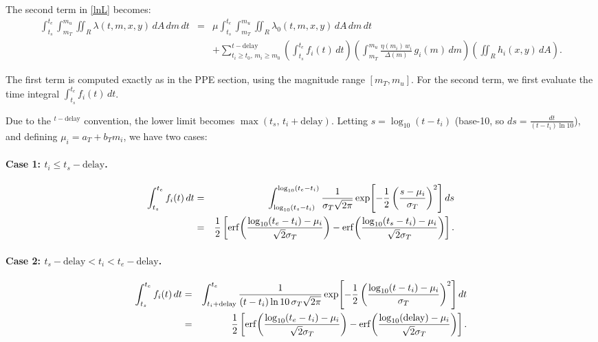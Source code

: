 \documentclass[linenum,doublespace,onecolumn]{SSA-SRL}
\theoremstyle{lemma}
\begin{document}
The second term in \eqref{lnL} becomes:
\begin{eqnarray*}
\int_{t_s}^{t_e} \int_{m_T}^{m_u} \iint_{R} \lambda(t, m, x, y)\, dA\, dm\, dt 
&=& \mu \int_{t_s}^{t_e} \int_{m_T}^{m_u} \iint_{R} \lambda_0(t, m, x, y)\, dA\, dm\, dt \\
&& + \sum_{t_i \ge t_0,\, m_i \ge m_0}^{t - \text{delay}} 
\left( \int_{t_s}^{t_e} f_i(t)\, dt \right)
\left( \int_{m_T}^{m_u} \frac{\eta(m_i)\, w_i}{\Delta(m)}\, g_i(m)\, dm \right)
\left( \iint_{R} h_i(x, y)\, dA \right).
\end{eqnarray*}

The first term is computed exactly as in the PPE section, using the magnitude range $[m_T, m_u]$. For the second term, we first evaluate the time integral $\int_{t_s}^{t_e} f_i(t)\, dt$.

Due to the ${}^{t - \text{delay}}$ convention, the lower limit becomes $\max(t_s,\, t_i + \text{delay})$. Letting $s = \log_{10}(t - t_i)$ (base-10, so $ds = \frac{dt}{(t - t_i)\ln 10}$), and defining $\mu_i = a_T + b_T m_i$, we have two cases:

\paragraph{Case 1: $t_i \le t_s - \text{delay}$.}
\begin{eqnarray}\label{intfi_case1}
\int_{t_s}^{t_e} f_i(t)\, dt 
&=& \int_{\log_{10}(t_s - t_i)}^{\log_{10}(t_e - t_i)} \frac{1}{\sigma_T \sqrt{2\pi}} 
\exp\!\left[-\frac{1}{2} \left( \frac{s - \mu_i}{\sigma_T} \right)^2 \right] ds \notag \\
&=& \frac{1}{2} \left[ \operatorname{erf}\!\left( \frac{\log_{10}(t_e - t_i) - \mu_i}{\sqrt{2}\sigma_T} \right)
- \operatorname{erf}\!\left( \frac{\log_{10}(t_s - t_i) - \mu_i}{\sqrt{2}\sigma_T} \right) \right].
\end{eqnarray}

\paragraph{Case 2: $t_s - \text{delay} < t_i < t_e - \text{delay}$.}
\begin{eqnarray}\label{intfi_case2}
\int_{t_s}^{t_e} f_i(t)\, dt 
&=& \int_{t_i + \text{delay}}^{t_e} \frac{1}{(t - t_i)\ln 10\, \sigma_T \sqrt{2\pi}} 
\exp\!\left[-\frac{1}{2} \left( \frac{\log_{10}(t - t_i) - \mu_i}{\sigma_T} \right)^2 \right] dt \notag \\
&=& \frac{1}{2} \left[ \operatorname{erf}\!\left( \frac{\log_{10}(t_e - t_i) - \mu_i}{\sqrt{2}\sigma_T} \right)
- \operatorname{erf}\!\left( \frac{\log_{10}(\text{delay}) - \mu_i}{\sqrt{2}\sigma_T} \right) \right].
\end{eqnarray}
\end{document}
